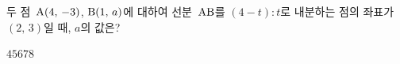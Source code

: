 두 점~$\mathrm{A}(4,\,-3)$, $\mathrm{B}(1,\,a)$에 대하여 선분~$\mathrm{AB}$를 $(4-t):t$로 내분하는 점의 좌표가 $(2,\,3)$일 때, $a$의 값은?
\begin{choices32}{$4$}{$5$}{$6$}{$7$}{$8$}\end{choices32}
